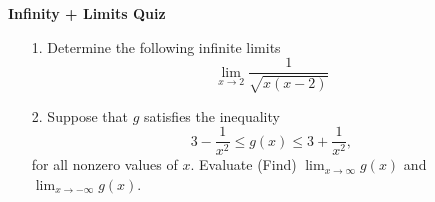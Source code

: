 \documentclass[11pt]{article}
\begin{document}

\centerline{\textbf{\Large{Infinity + Limits Quiz}}}

\vspace{0.2in}
 

\begin{enumerate}

\item[1.] Determine the following infinite limits
$$\lim_{x \to 2} \frac{1}{\sqrt{x(x - 2)}}$$
	
\item[2.] Suppose that $g$ satisfies the inequality 
	$$ 3 - \frac{1}{x^2} \leq g(x) \leq 3 + \frac{1}{x^2},$$
	for all nonzero values of $x$. Evaluate (Find) $\lim_{x\to \infty} g(x)$ and $\lim_{x\to - \infty} g(x)$. 

\end{enumerate}
 
\end{document}
